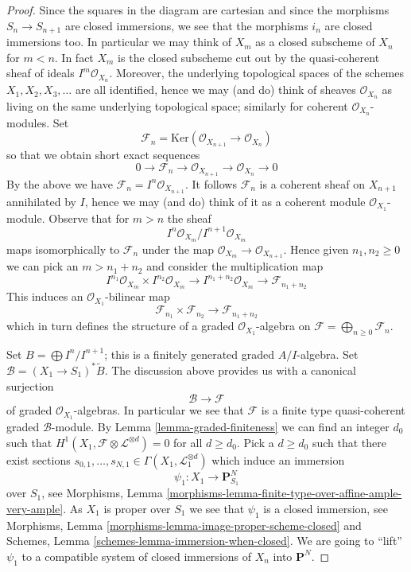 \begin{proof}
Since the squares in the diagram are cartesian and since the morphisms
$S_n \to S_{n + 1}$ are closed immersions, we see that the morphisms
$i_n$ are closed immersions too. In particular we may think of
$X_m$ as a closed subscheme of $X_n$ for $m < n$. In fact $X_m$ is
the closed subscheme cut out by the quasi-coherent sheaf of ideals
$I^m\mathcal{O}_{X_n}$. Moreover, the underlying topological spaces
of the schemes $X_1, X_2, X_3, \ldots$ are all identified, hence we
may (and do) think of sheaves $\mathcal{O}_{X_n}$ as living on the
same underlying topological space; similarly for coherent
$\mathcal{O}_{X_n}$-modules. Set
$$
\mathcal{F}_n =
\text{Ker}(\mathcal{O}_{X_{n + 1}} \to \mathcal{O}_{X_n})
$$
so that we obtain short exact sequences
$$
0 \to \mathcal{F}_n \to \mathcal{O}_{X_{n + 1}} \to \mathcal{O}_{X_n} \to 0
$$
By the above we have $\mathcal{F}_n = I^n\mathcal{O}_{X_{n + 1}}$.
It follows $\mathcal{F}_n$ is a coherent sheaf on $X_{n + 1}$
annihilated by $I$, hence we may (and do) think of it as a coherent
module $\mathcal{O}_{X_1}$-module. Observe that for $m > n$ the sheaf
$$
I^n\mathcal{O}_{X_m}/I^{n + 1}\mathcal{O}_{X_m}
$$
maps isomorphically to $\mathcal{F}_n$ under the map
$\mathcal{O}_{X_m} \to \mathcal{O}_{X_{n + 1}}$. Hence given
$n_1, n_2 \geq 0$ we can pick an $m > n_1 + n_2$ and consider the
multiplication map
$$
I^{n_1}\mathcal{O}_{X_m} \times I^{n_2}\mathcal{O}_{X_m}
\longrightarrow
I^{n_1 + n_2}\mathcal{O}_{X_m} \to \mathcal{F}_{n_1 + n_2}
$$
This induces an $\mathcal{O}_{X_1}$-bilinear map
$$
\mathcal{F}_{n_1} \times \mathcal{F}_{n_2} \longrightarrow
\mathcal{F}_{n_1 + n_2}
$$
which in turn defines the structure of a graded $\mathcal{O}_{X_1}$-algebra
on $\mathcal{F} = \bigoplus_{n \geq 0} \mathcal{F}_n$.

\medskip\noindent
Set $B = \bigoplus I^n/I^{n + 1}$; this is a finitely generated
graded $A/I$-algebra. Set $\mathcal{B} = (X_1 \to S_1)^*\widetilde{B}$.
The discussion above provides us with a canonical surjection
$$
\mathcal{B} \longrightarrow \mathcal{F}
$$
of graded $\mathcal{O}_{X_1}$-algebras. In particular we see that
$\mathcal{F}$ is a finite type quasi-coherent graded $\mathcal{B}$-module.
By Lemma \ref{lemma-graded-finiteness} we can find an integer $d_0$
such that $H^1(X_1, \mathcal{F} \otimes \mathcal{L}^{\otimes d}) = 0$
for all $d \geq d_0$. Pick a $d \geq d_0$ such that there exist sections
$s_{0, 1}, \ldots, s_{N, 1} \in \Gamma(X_1, \mathcal{L}_1^{\otimes d})$
which induce an immersion
$$
\psi_1 : X_1 \to \mathbf{P}^N_{S_1}
$$
over $S_1$, see
Morphisms, Lemma \ref{morphisms-lemma-finite-type-over-affine-ample-very-ample}.
As $X_1$ is proper over $S_1$ we see that $\psi_1$
is a closed immersion, see
Morphisms, Lemma \ref{morphisms-lemma-image-proper-scheme-closed}
and
Schemes, Lemma \ref{schemes-lemma-immersion-when-closed}.
We are going to ``lift'' $\psi_1$ to a compatible system of
closed immersions of $X_n$ into $\mathbf{P}^N$.


\end{proof}
